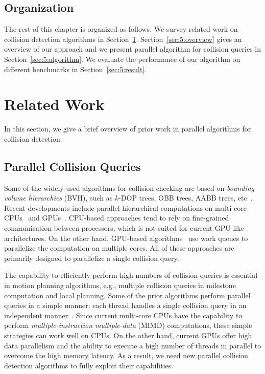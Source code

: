 \subsection{Organization}
The rest of this chapter is organized as follows. We survey related work on collision detection
algorithms in Section~\ref{sec:5:related}. Section~\ref{sec:5:overview} gives an overview of our approach and we present parallel algorithm
for collision queries in Section~\ref{sec:5:algorithm}. We evaluate the performance of our algorithm on different benchmarks in Section~\ref{sec:5:result}.

\section{Related Work}
\label{sec:5:related}
In this section, we give a brief overview of prior work in parallel algorithms for collision
detection.

\subsection{Parallel Collision Queries}
Some of the widely-used algorithms for collision checking are based on \emph{bounding volume hierarchies} (BVH),
such as $k$-DOP trees, OBB trees, AABB trees, etc~\cite{LM03}. Recent developments include parallel hierarchical computations on multi-core CPUs~\cite{Kim08,TMT10-GMOD} and GPUs~\cite{Lauterbach10}. CPU-based approaches tend to rely on fine-grained communication
between processors, which is not suited for current GPU-like architectures. On the other hand, GPU-based
algorithms~\cite{Lauterbach10} use work queues
to parallelize the computation on multiple cores. All of these approaches are primarily designed to parallelize a
single collision query.

The capability to efficiently perform high numbers of collision queries is essential in motion planning algorithms, e.g., multiple collision queries in milestone computation and local planning. Some of the prior algorithms
perform parallel queries in a simple manner: each thread handles a single collision query in an independent
manner~\cite{Amato99,akinc+2003:prt-p}. Since current multi-core CPUs have the capability to perform \emph{multiple-instruction multiple-data} (MIMD) computations, these simple strategies can work well on CPUs.
On the other hand, current GPUs offer high data parallelism and the ability to execute a high number of threads
in parallel to overcome the high memory latency. As a result, we need new parallel collision detection algorithms
to fully exploit their capabilities.

